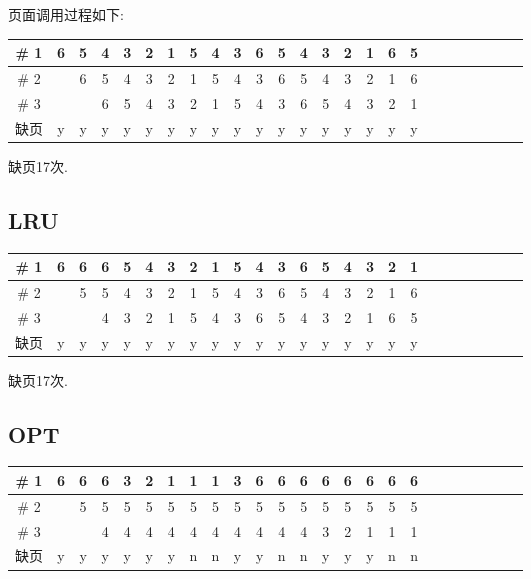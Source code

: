 \documentclass[a4paper, 12pt, notitlepage]{article}
\begin{document}
	页面调用过程如下: 

\begin{table}[H]
\centering

	\begin{tabular}{|c|c|c|c|c|c|c|c|c|c|c|c|c|c|c|c|c|c|c|c|c|c|c|c|c|}
		\hline
		\# 1 & 6 & 5 & 4 & 3 & 2 & 1 & 5 & 4 & 3 & 6 & 5 & 4 & 3 & 2 & 1 & 6 & 5 \\
		\hline
		\# 2 &   & 6 & 5 & 4 & 3 & 2 & 1 & 5 & 4 & 3 & 6 & 5 & 4 & 3 & 2 & 1 & 6 \\
		\hline
		\# 3 &   &   & 6 & 5 & 4 & 3 & 2 & 1 & 5 & 4 & 3 & 6 & 5 & 4 & 3 & 2 & 1 \\
		\hline
		缺页 & y & y & y & y & y & y & y & y & y & y & y & y & y & y & y & y & y \\
		\hline		
	\end{tabular}

\end{table}

	缺页17次. 
	
\subsection{LRU}
		
\begin{table}[H]
\centering

	\begin{tabular}{|c|c|c|c|c|c|c|c|c|c|c|c|c|c|c|c|c|c|c|c|c|c|c|c|c|}
		\hline
		\# 1 & 6 & 6 & 6 & 5 & 4 & 3 & 2 & 1 & 5 & 4 & 3 & 6 & 5 & 4 & 3 & 2 & 1 \\
		\hline
		\# 2 &   & 5 & 5 & 4 & 3 & 2 & 1 & 5 & 4 & 3 & 6 & 5 & 4 & 3 & 2 & 1 & 6 \\
		\hline
		\# 3 &   &   & 4 & 3 & 2 & 1 & 5 & 4 & 3 & 6 & 5 & 4 & 3 & 2 & 1 & 6 & 5 \\
		\hline
		缺页 & y & y & y & y & y & y & y & y & y & y & y & y & y & y & y & y & y \\
		\hline		
	\end{tabular}

\end{table}

	缺页17次. 
	
\subsection{OPT}		
	
\begin{table}[H]
\centering

	\begin{tabular}{|c|c|c|c|c|c|c|c|c|c|c|c|c|c|c|c|c|c|c|c|c|c|c|c|c|}
		\hline
		\# 1 & 6 & 6 & 6 & 3 & 2 & 1 & 1 & 1 & 3 & 6 & 6 & 6 & 6 & 6 & 6 & 6 & 6 \\
		\hline
		\# 2 &   & 5 & 5 & 5 & 5 & 5 & 5 & 5 & 5 & 5 & 5 & 5 & 5 & 5 & 5 & 5 & 5 \\
		\hline
		\# 3 &   &   & 4 & 4 & 4 & 4 & 4 & 4 & 4 & 4 & 4 & 4 & 3 & 2 & 1 & 1 & 1 \\
		\hline
		缺页 & y & y & y & y & y & y & n & n & y & y & n & n & y & y & y & n & n \\
		\hline	
	\end{tabular}

\end{table}
\end{document}
